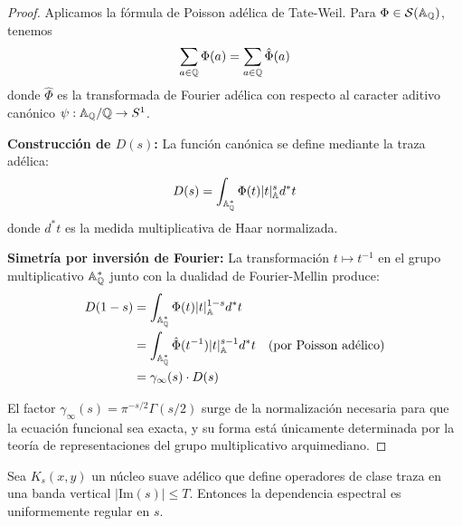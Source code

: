 \begin{proof}
Aplicamos la fórmula de Poisson adélica de Tate-Weil. Para $\Phi \in \mathcal S(\Bbb A_\Bbb Q)$, tenemos
$$\sum_{a \in \Bbb Q} \Phi(a) = \sum_{a \in \Bbb Q} \hat{\Phi}(a)$$
donde $\hat{\Phi}$ es la transformada de Fourier adélica con respecto al caracter aditivo canónico $\psi: \Bbb A_\Bbb Q/\Bbb Q \to S^1$.

\textbf{Construcción de $D(s)$:} La función canónica se define mediante la traza adélica:
$$D(s) = \int_{\Bbb A_\Bbb Q^*} \Phi(t) |t|_{\Bbb A}^s d^*t$$
donde $d^*t$ es la medida multiplicativa de Haar normalizada.

\textbf{Simetría por inversión de Fourier:} La transformación $t \mapsto t^{-1}$ en el grupo multiplicativo $\Bbb A_\Bbb Q^*$ junto con la dualidad de Fourier-Mellin produce:
\begin{align}
D(1-s) &= \int_{\Bbb A_\Bbb Q^*} \Phi(t) |t|_{\Bbb A}^{1-s} d^*t \\
&= \int_{\Bbb A_\Bbb Q^*} \hat{\Phi}(t^{-1}) |t|_{\Bbb A}^{s-1} d^*t \quad \text{(por Poisson adélico)} \\
&= \gamma_\infty(s) \cdot D(s)
\end{align}

El factor $\gamma_\infty(s) = \pi^{-s/2}\Gamma(s/2)$ surge de la normalización necesaria para que la ecuación funcional sea exacta, y su forma está únicamente determinada por la teoría de representaciones del grupo multiplicativo arquimediano.
\end{proof}

\begin{lemma}
\label{lemma:a4-spectral-regularity}
Sea $K_s(x,y)$ un núcleo suave adélico que define operadores de clase traza en una banda vertical $|\text{Im}(s)| \leq T$. Entonces la dependencia espectral es uniformemente regular en $s$.
\end{lemma}

